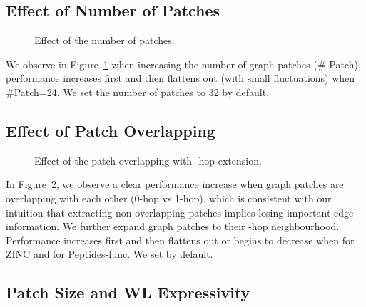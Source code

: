 \documentclass{article}
\begin{document}
\subsection{Effect of Number of Patches}


\begin{figure}[!ht]
\centering     {}
\hspace{8mm}
\caption{Effect of the number of patches.}
\label{fig: num patch}
\end{figure}

We observe in Figure~\ref{fig: num patch} when increasing the number of graph patches (\# Patch), performance increases first and then flattens out (with small fluctuations) when \#Patch=24. We set the number of patches to 32 by default.


\subsection{Effect of Patch Overlapping}
\begin{figure}[!ht]
\centering     {}
\caption{Effect of the patch overlapping with -hop extension.}
\label{fig: k-hop}
\end{figure}
In Figure~\ref{fig: k-hop}, we observe a clear performance increase when graph patches are overlapping with each other (0-hop vs 1-hop), which is consistent with our intuition that extracting non-overlapping patches implies losing important edge information. We further expand graph patches to their -hop neighbourhood. Performance increases first and then flattens out or begins to decrease when  for ZINC and  for Peptides-func. We set  by default.



\subsection{Patch Size and WL Expressivity}
\end{document}
